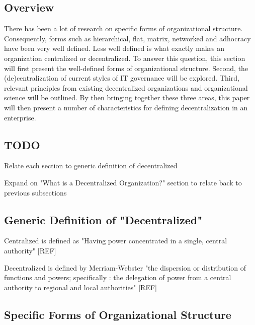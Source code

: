 \subsection{Overview}
There has been a lot of research on specific forms of organizational structure. Consequently, forms such as hierarchical, flat, matrix, networked and adhocracy have been very well defined. Less well defined is what exactly makes an organization centralized or decentralized. To answer this question, this section will first present the well-defined forms of organizational structure. Second, the (de)centralization of current styles of IT governance will be explored. Third, relevant principles from existing decentralized organizations and organizational science will be outlined. By then bringing together these three areas, this paper will then present a number of characteristics for defining decentralization in an enterprise. 

\subsection{TODO}
Relate each section to generic definition of decentralized

Expand on "What is a Decentralized Organization?" section to relate back to previous subsections

\subsection{Generic Definition of "Decentralized"}



Centralized is defined as "Having power concentrated in a single, central authority" [REF]

Decentralized is defined by Merriam-Webster "the dispersion or distribution of functions and powers; specifically : the delegation of power from a central authority to regional and local authorities" [REF]



\subsection{Specific Forms of Organizational Structure}
\label{org:form}

